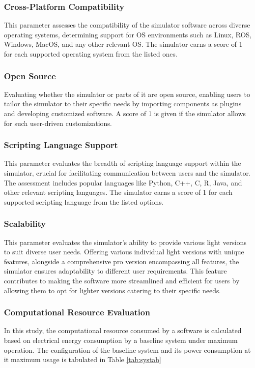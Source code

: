 \documentclass[12pt,twoside,a4paper,parskip]{scrbook} %
\begin{document}
\subsubsection{Cross-Platform Compatibility}
This parameter assesses the compatibility of the simulator software across diverse operating systems, determining support for OS environments such as Linux, ROS, Windows, MacOS, and any other relevant OS. The simulator earns a score of 1 for each supported operating system from the listed ones.

\subsubsection{Open Source}
Evaluating whether the simulator or parts of it are open source, enabling users to tailor the simulator to their specific needs by importing components as plugins and developing customized software. A score of 1 is given if the simulator allows for such user-driven customizations.

\subsubsection{Scripting Language Support}
This parameter evaluates the breadth of scripting language support within the simulator, crucial for facilitating communication between users and the simulator. The assessment includes popular languages like Python, C++, C, R, Java, and other relevant scripting languages. The simulator earns a score of 1 for each supported scripting language from the listed options.

\subsubsection{Scalability}
This parameter evaluates the simulator's ability to provide various light versions to suit diverse user needs. Offering various individual light versions with unique features, alongside a comprehensive pro version encompassing all features, the simulator ensures adaptability to different user requirements. This feature contributes to making the software more streamlined and efficient for users by allowing them to opt for lighter versions catering to their specific needs.

\subsubsection{Computational Resource Evaluation}
In this study, the computational resource consumed by a software is calculated based on electrical energy consumption by a baseline system under maximum operation. The configuration of the baseline system and its power consumption at it maximum usage is tabulated in Table \ref{tab:systab}
\end{document}
